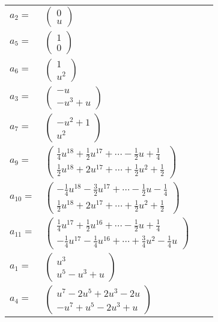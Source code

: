 \documentclass[1p]{elsarticle_modified}
\theoremstyle{definition}
\begin{document}
\begin{tabular}{m{7pt} m{180pt} m{7pt} m{180pt} }
\flushright $a_{2}=$&$\begin{pmatrix}0\\u\end{pmatrix}$ \\
\flushright $a_{5}=$&$\begin{pmatrix}1\\0\end{pmatrix}$ \\
\flushright $a_{6}=$&$\begin{pmatrix}1\\u^2\end{pmatrix}$ \\
\flushright $a_{3}=$&$\begin{pmatrix}- u\\- u^3+u\end{pmatrix}$ \\
\flushright $a_{7}=$&$\begin{pmatrix}- u^2+1\\u^2\end{pmatrix}$ \\
\flushright $a_{9}=$&$\begin{pmatrix}\frac{1}{4} u^{18}+\frac{1}{2} u^{17}+\cdots-\frac{1}{2} u+\frac{1}{4}\\\frac{1}{2} u^{18}+2 u^{17}+\cdots+\frac{1}{2} u^2+\frac{1}{2}\end{pmatrix}$ \\
\flushright $a_{10}=$&$\begin{pmatrix}-\frac{1}{4} u^{18}-\frac{3}{2} u^{17}+\cdots-\frac{1}{2} u-\frac{1}{4}\\\frac{1}{2} u^{18}+2 u^{17}+\cdots+\frac{1}{2} u^2+\frac{1}{2}\end{pmatrix}$ \\
\flushright $a_{11}=$&$\begin{pmatrix}\frac{1}{4} u^{17}+\frac{1}{2} u^{16}+\cdots-\frac{1}{2} u+\frac{1}{4}\\-\frac{1}{4} u^{17}-\frac{1}{4} u^{16}+\cdots+\frac{3}{4} u^2-\frac{1}{4} u\end{pmatrix}$ \\
\flushright $a_{1}=$&$\begin{pmatrix}u^3\\u^5- u^3+u\end{pmatrix}$ \\
\flushright $a_{4}=$&$\begin{pmatrix}u^7-2 u^5+2 u^3-2 u\\- u^7+u^5-2 u^3+u\end{pmatrix}$ \\

\end{tabular}
\end{document}
